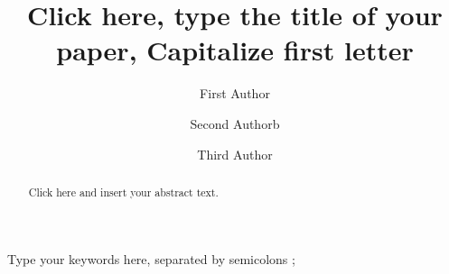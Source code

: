\documentclass[3p,times,procedia]{elsarticle}
\begin{document}
\begin{frontmatter}




\title{Click here, type the title of your paper, Capitalize first letter}


\author[a]{First Author} 
\author[b]{Second Authorb}
\author[a,b]{Third Author}

\address[a]{First affiliation, Address, City and Postcode, Country}
\address[b]{Second affiliation, Address, City and Postcode, Country}

\begin{abstract}
Click here and insert your abstract text.
\end{abstract}

\begin{keyword}
Type your keywords here, separated by semicolons ; 




\end{keyword}

\end{frontmatter}
\end{document}
